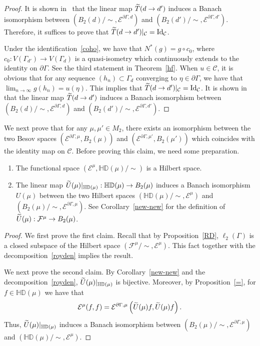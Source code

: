 \documentclass[AHL,Unicode,longabstracts,published]{cedram}
\newcommand{\ce}{\mathcal{E}}
\newcommand{\cf}{\mathcal{F}}
\newcommand{\cC}{\mathcal{C}}
\newcommand{\bHD}{\mathbb{HD}}
\newcommand{\rmId}{\mathrm{Id}}
\let\oldtilde\tilde
\renewcommand*{\tilde}[1]{\mathchoice{\widetilde{#1}}{\widetilde{#1}}{\oldtilde{#1}}{\oldtilde{#1}}}
\begin{document}
\begin{proof}
It is shown in~\cite{BP} that the linear map $\tilde{T}(d\to d')$ induces a Banach isomorphism between $(B_2(d)/\sim,\ce^{\partial\Gamma,d})$ and $(B_2(d')/\sim,\ce^{\partial\Gamma,d'})$. Therefore, it suffices to prove that $\tilde{T}(d\to d')|_{\cC}=\rmId_{\cC}$.

Under the identification~\eqref{coho}, we have that $N^*(g)=g\circ c_0$, where $c_0:V(\Gamma_{d'})\rightarrow V(\Gamma_{d})$ is a quasi-isometry which continuously extends to the identity on $\partial\Gamma$. See the third statement in Theorem~\ref{hf}. When $u\in\cC$, it is obvious that for any sequence $(h_n)\subset\Gamma_{d}$ converging to $\eta\in\partial\Gamma$, we have that $\lim_{n\to\infty}g(h_n)=u(\eta)$. This implies that $\tilde{T}(d\to d')|_\cC=\rmId_\cC$. It is shown in~\cite{BP} that the linear map $\tilde{T}(d\to d')$ induces a Banach isomorphism between $(B_2(d)/\sim,\ce^{\partial\Gamma,d})$ and $(B_2(d')/\sim,\ce^{\partial\Gamma,d'})$.
\end{proof}


We next prove that for any $\mu,\mu'
\in M_2$, there exists an isomorphism between the two Besov spaces $(\ce^{\partial\Gamma,\mu},B_2(\mu))$ and $(\ce^{\partial\Gamma,\mu'},B_2(\mu'))$ which coincides with the identity map on $\cC$. Before proving this claim, we need some preparation.



\begin{lemm}\label{umu}\leavevmode
\begin{enumerate}
\item\label{lemm5.13.1} The functional space $(\ce^{\mu},\bHD(\mu)/\sim)$ is a Hilbert space.
\item\label{lemm5.13.2} The linear map $\tilde{U}(\mu)|_{\bHD(\mu)}:\bHD(\mu)\to B_2(\mu)$ induces a Banach isomorphism $U(\mu)$ between the two Hilbert spaces $(\bHD(\mu)/\sim,\ce^{\mu})$ and $(B_2(\mu)/\sim,\ce^{\partial\Gamma,\mu})$. See Corollary~\ref{new-new} for the definition of $\tilde{U}(\mu):\cf^{\mu}\to B_2(\mu)$.
\end{enumerate}
\end{lemm}

\begin{proof}
We first prove the first claim. Recall that by Proposition~\ref{RD}, $\ell_2(\Gamma)$ is a closed subspace of the Hilbert space $(\cf^{\mu}/\sim,\ce^{\mu})$. This fact together with the decomposition~\eqref{royden} implies the result.

We next prove the second claim. By Corollary~\ref{new-new} and the decomposition~\eqref{royden}, $\tilde{U}(\mu)|_{\bHD(\mu)}$ is bijective. Moreover, by Proposition~\ref{=}, for $f\in\bHD(\mu)$ we have that
\begin{align*}
\ce^{\mu}(f,f)=\ce^{\partial\Gamma,\mu}\left(\tilde{U}(\mu)f,\tilde{U}(\mu)f\right).
\end{align*}
Thus, $\tilde{U}(\mu)|_{\bHD(\mu)}$ induces a Banach isomorphism between $(B_2(\mu)/\sim,\ce^{\partial\Gamma,\mu})$ and $(\bHD(\mu)/\sim,\ce^{\mu})$.
\end{proof}
\end{document}
